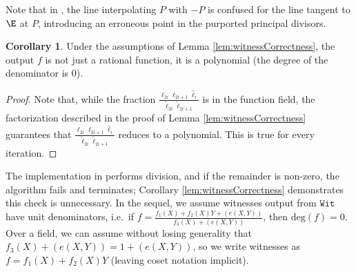 \documentclass[11pt,letterpaper]{article}
\theoremstyle{definition}
\newtheorem{corollary}[theorem]{Corollary}
\newcommand{\6}{\mathbf}
\newcommand{\7}{\mathcal}
\begin{document}
Note that in \cite{Kayaba}, the line interpolating $P$ with $-P$ is confused for the line tangent to $\E$ at $P$, introducing an erroneous point in the purported principal divisors. 


\begin{corollary}
Under the assumptions of Lemma \ref{lem:witnessCorrectness}, the output $f$ is not just a rational function, it is a polynomial (the degree of the denominator is $0$).
\end{corollary}
\begin{proof}
Note that, while the fraction $\frac{\ell_{2i}\ell_{2i+1}\widehat{\ell}_i}{\widetilde{\ell}_{2i}\widetilde{\ell}_{2i+1}}$ is in the function field, the factorization described in the proof of Lemma \ref{lem:witnessCorrectness} guarantees that $\frac{\ell_{2i}\ell_{2i+1}\widehat{\ell}_i}{\widetilde{\ell}_{2i}\widetilde{\ell}_{2i+1}}$ reduces to a polynomial. This is true for every iteration. 
\end{proof}

The implementation in \cite{Kayaba} performs division, and if the remainder is non-zero, the algorithm fails and terminates; Corollary \ref{lem:witnessCorrectness} demonstrates this check is unnecessary.
In the sequel, we assume witnesses output from $\texttt{Wit}$ have unit denominators, i.e.\ if $f = \frac{f_1(X) + f_2(X)Y + (e(X,Y))}{f_3(X) + (e(X,Y))}$, then $\text{deg}(f) = 0$. Over a field, we can assume without losing generality that $f_3(X) + (e(X,Y)) = 1 + (e(X,Y))$, so we write witnesses as $f = f_1(X) + f_2(X)Y$ (leaving coset notation implicit).
\end{document}
